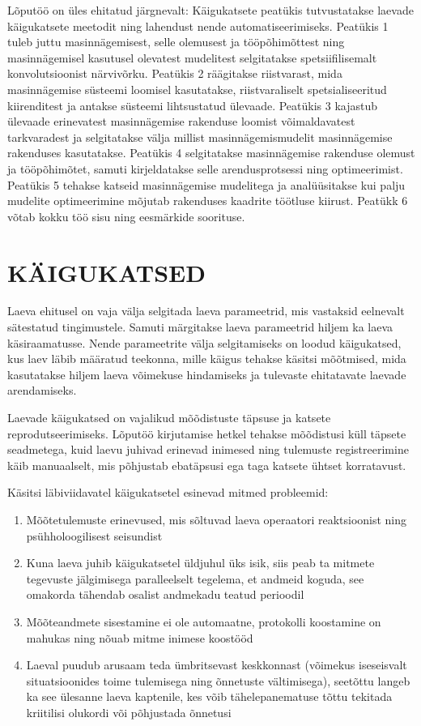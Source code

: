 \documentclass[12pt,a4paper]{report}
\begin{document}
Lõputöö on üles ehitatud järgnevalt: Käigukatsete peatükis tutvustatakse laevade käigukatsete meetodit ning lahendust nende automatiseerimiseks. Peatükis 1 tuleb juttu masinnägemisest, selle olemusest ja tööpõhimõttest ning masinnägemisel kasutusel olevatest mudelitest selgitatakse spetsiifilisemalt konvolutsioonist närvivõrku. Peatükis 2 räägitakse riistvarast, mida masinnägemise süsteemi loomisel kasutatakse, riistvaraliselt spetsialiseeritud kiirenditest ja antakse süsteemi lihtsustatud ülevaade. Peatükis 3 kajastub ülevaade erinevatest masinnägemise rakenduse loomist võimaldavatest tarkvaradest ja selgitatakse välja millist masinnägemismudelit masinnägemise rakenduses kasutatakse. Peatükis 4 selgitatakse masinnägemise rakenduse olemust ja tööpõhimõtet, samuti kirjeldatakse selle arendusprotsessi ning optimeerimist. Peatükis 5 tehakse katseid masinnägemise mudelitega ja analüüsitakse kui palju mudelite optimeerimine mõjutab rakenduses kaadrite töötluse kiirust. Peatükk 6 võtab kokku töö sisu ning eesmärkide soorituse.

\section{KÄIGUKATSED}\label{kuxe4igukatsed}

Laeva ehitusel on vaja välja selgitada laeva parameetrid, mis vastaksid eelnevalt sätestatud tingimustele. Samuti märgitakse laeva parameetrid hiljem ka laeva käsiraamatusse. Nende parameetrite välja selgitamiseks on loodud käigukatsed, kus laev läbib määratud teekonna, mille käigus tehakse käsitsi mõõtmised, mida kasutatakse hiljem laeva võimekuse hindamiseks ja tulevaste ehitatavate laevade arendamiseks.

Laevade käigukatsed on vajalikud mõõdistuste täpsuse ja katsete reprodutseerimiseks. Lõputöö kirjutamise hetkel tehakse mõõdistusi küll täpsete seadmetega, kuid laevu juhivad erinevad inimesed ning tulemuste registreerimine käib manuaalselt, mis põhjustab ebatäpsusi ega taga katsete ühtset korratavust.

Käsitsi läbiviidavatel käigukatsetel esinevad mitmed probleemid:

\begin{enumerate}
\def\labelenumi{\arabic{enumi}.}
\item
  Mõõtetulemuste erinevused, mis sõltuvad laeva operaatori reaktsioonist ning psühholoogilisest seisundist
\item
  Kuna laeva juhib käigukatsetel üldjuhul üks isik, siis peab ta mitmete tegevuste jälgimisega paralleelselt tegelema, et andmeid koguda, see omakorda tähendab osalist andmekadu teatud perioodil
\item
  Mõõteandmete sisestamine ei ole automaatne, protokolli koostamine on mahukas ning nõuab mitme inimese koostööd
\item
  Laeval puudub arusaam teda ümbritsevast keskkonnast (võimekus iseseisvalt situatsioonides toime tulemisega ning õnnetuste vältimisega), seetõttu langeb ka see ülesanne laeva kaptenile, kes võib tähelepanematuse tõttu tekitada kriitilisi olukordi või põhjustada õnnetusi
\end{enumerate}
\end{document}
